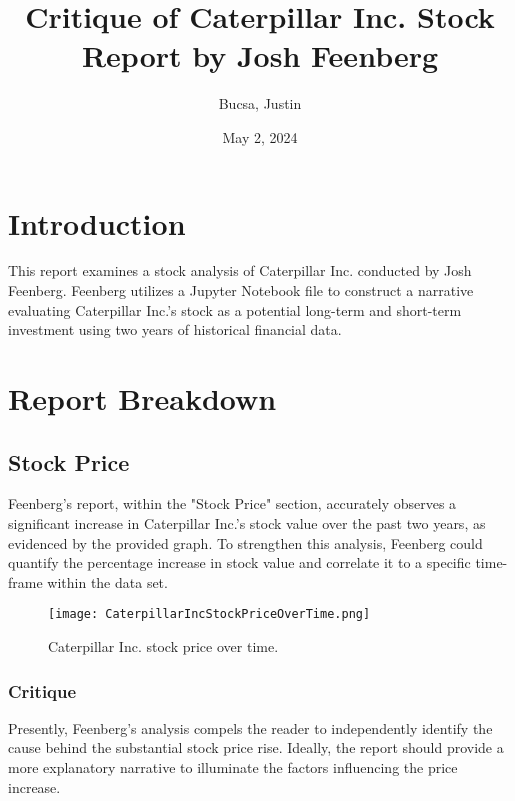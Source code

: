 \documentclass[9pt,a4paper,twoside]{tau}
\title{Critique of Caterpillar Inc. Stock Report by Josh Feenberg }
\author[a,1]{Bucsa, Justin}
\affil[a]{Stealth}
\date{May 2, 2024}
\begin{document}
		
	\maketitle
	\thispagestyle{firststyle}
	\tauabstract
	\tableofcontents


\section{Introduction}

    This report examines a stock analysis of Caterpillar Inc. conducted by Josh Feenberg. Feenberg utilizes a Jupyter Notebook file to construct a narrative evaluating Caterpillar Inc.'s stock as a potential long-term and short-term investment using two years of historical financial data. 
    
\section{Report Breakdown}

    \subsection{Stock Price}
	
        Feenberg's report, within the "Stock Price" section, accurately observes a significant increase in Caterpillar Inc.'s stock value over the past two years, as evidenced by the provided graph. To strengthen this analysis, Feenberg could quantify the percentage increase in stock value and correlate it to a specific time-frame within the data set.

            \begin{figure}[H]
                \centering
                \texttt{[image: CaterpillarIncStockPriceOverTime.png]}
                \caption{Caterpillar Inc. stock price over time\cite{feenberg-2024}.} 
                \label {fig:figure}
            \end{figure}

            \subsubsection{Critique}

            Presently, Feenberg's analysis compels the reader to independently identify the cause behind the substantial stock price rise. Ideally, the report should provide a more explanatory narrative to illuminate the factors influencing the price increase.
    
\end{document}
